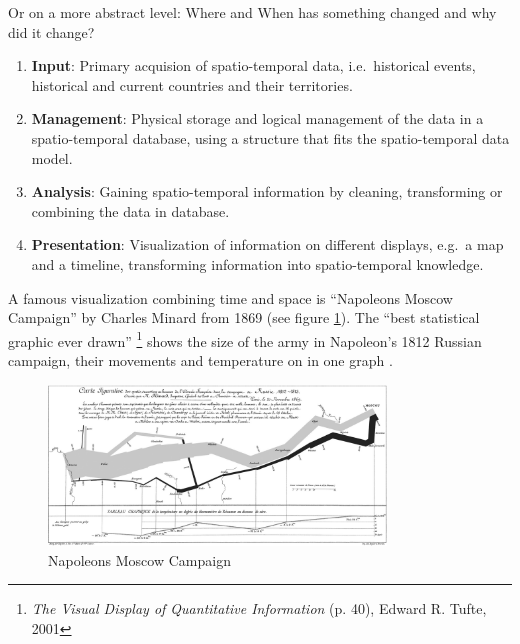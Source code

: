 Or on a more abstract level: Where and When has something changed and why did it change?

\begin{enumerate}
  \item \textbf{Input}: Primary acquision of spatio-temporal data, i.e.\ historical events, historical and current countries and their territories.
  \item \textbf{Management}: Physical storage and logical management of the data in a spatio-temporal database, using a structure that fits the spatio-temporal data model.
  \item \textbf{Analysis}: Gaining spatio-temporal information by cleaning, transforming or combining the data in database.
  \item \textbf{Presentation}: Visualization of information on different displays, e.g.\ a map and a timeline, transforming information into spatio-temporal knowledge.
\end{enumerate}


A famous visualization combining time and space is ``Napoleons Moscow Campaign'' by Charles Minard from 1869 (see figure \ref{fig:minard_napoleon}). The ``best statistical graphic ever drawn''
\footnote{
  \emph{The Visual Display of Quantitative Information} (p. 40),
  Edward R. Tufte,
  2001
}
shows the size of the army in Napoleon’s 1812 Russian campaign, their movements and temperature on in one graph
\cite[pp. 188-191]{knowles2008placing}.

\begin{figure}[ht]
  \centering
  \includegraphics[width=0.8\textwidth]{graphics/basics/napoleon_march_moscow.png}
  \caption{Napoleons Moscow Campaign \protect\footnotemark}
  \label{fig:minard_napoleon}
\end{figure}


